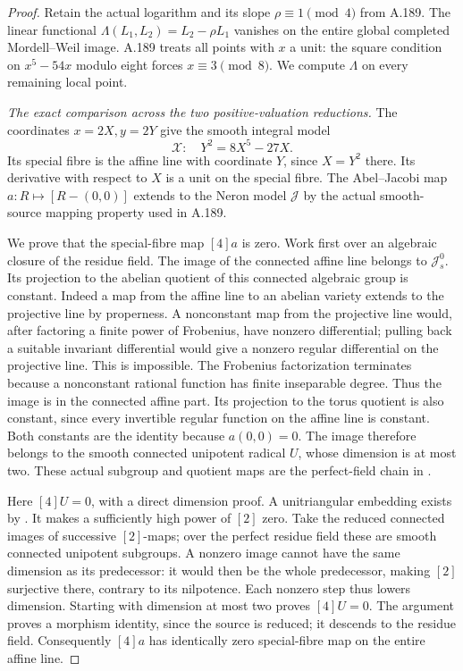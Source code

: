 \begin{proof}
Retain the actual logarithm and its slope \(\rho\equiv1\pmod4\)
from A.189.  The linear functional
\(\Lambda(L_1,L_2)=L_2-\rho L_1\) vanishes on the
entire global completed Mordell--Weil image.  A.189 treats
all points with \(x\) a unit: the square condition on
\(x^5-54x\) modulo eight forces \(x\equiv3\pmod8\).
We compute \(\Lambda\) on every remaining local point.

\emph{The exact comparison across the two positive-valuation reductions.}
The coordinates \(x=2X,y=2Y\) give the smooth integral
model
\[
                 \mathcal X:\quad Y^2=8X^5-27X.
\tag{A.192.4}
\]
Its special fibre is the affine line with coordinate \(Y\),
since \(X=Y^2\) there.  Its derivative with respect to
\(X\) is a unit on the special fibre.  The Abel--Jacobi
map \(a:R\mapsto[R-(0,0)]\) extends to the Neron
model \(\mathcal J\) by the actual smooth-source
mapping property used in A.189.

We prove that the special-fibre map \([4]a\) is zero.
Work first over an algebraic closure of the residue field.
The image of the connected affine line belongs to
\(\mathcal J_s^0\).  Its projection to the abelian
quotient of this connected algebraic group is constant.
Indeed a map from the affine line to an abelian variety
extends to the projective line by properness.  A nonconstant
map from the projective line would, after factoring a
finite power of Frobenius, have nonzero differential;
pulling back a suitable invariant differential would
give a nonzero regular differential on the projective
line.  This is impossible.  The Frobenius factorization
terminates because a nonconstant rational function has
finite inseparable degree.  Thus the image is in the
connected affine part.  Its projection to the torus
quotient is also constant, since every invertible
regular function on the affine line is constant.
Both constants are the identity because \(a(0,0)=0\).
The image therefore belongs to the smooth connected
unipotent radical \(U\), whose dimension is at most two.
These actual subgroup and quotient maps are the
perfect-field chain in
\cite[\S5.9.1, equation (5.9.1), p.147]{LegPoonenRationalPoints}.

Here \([4]U=0\), with a direct dimension proof.
A unitriangular embedding exists by
\cite[Theorem 5.4.8(ii), p.128]{LegPoonenRationalPoints}.
It makes a sufficiently high power of \([2]\) zero.
Take the reduced connected images of successive
\([2]\)-maps; over the perfect residue field these
are smooth connected unipotent subgroups.  A nonzero
image cannot have the same dimension as its predecessor:
it would then be the whole predecessor, making \([2]\)
surjective there, contrary to its nilpotence.  Each
nonzero step thus lowers dimension.  Starting with
dimension at most two proves \([4]U=0\).
The argument proves a morphism identity, since the
source is reduced; it descends to the residue field.
Consequently \([4]a\) has identically zero special-fibre
map on the entire affine line.


\end{proof}
